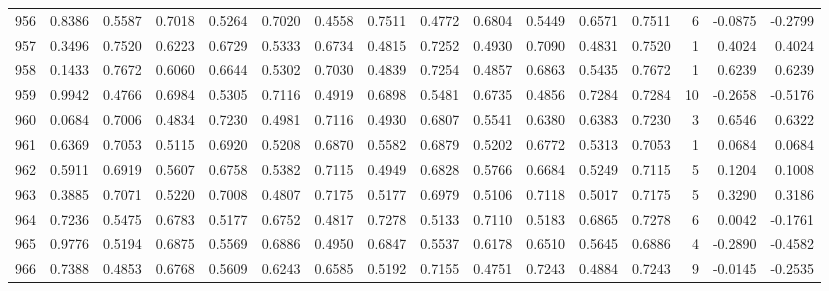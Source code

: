 \begin{tabular}{lrrrrrrrrrrrrrrr}
956 &      0.8386 &  0.5587 &  0.7018 &  0.5264 &  0.7020 &  0.4558 &  0.7511 &  0.4772 &  0.6804 &  0.5449 &   0.6571 &     0.7511 &      6 &                   -0.0875 &                    -0.2799 \\
957 &      0.3496 &  0.7520 &  0.6223 &  0.6729 &  0.5333 &  0.6734 &  0.4815 &  0.7252 &  0.4930 &  0.7090 &   0.4831 &     0.7520 &      1 &                    0.4024 &                     0.4024 \\
958 &      0.1433 &  0.7672 &  0.6060 &  0.6644 &  0.5302 &  0.7030 &  0.4839 &  0.7254 &  0.4857 &  0.6863 &   0.5435 &     0.7672 &      1 &                    0.6239 &                     0.6239 \\
959 &      0.9942 &  0.4766 &  0.6984 &  0.5305 &  0.7116 &  0.4919 &  0.6898 &  0.5481 &  0.6735 &  0.4856 &   0.7284 &     0.7284 &     10 &                   -0.2658 &                    -0.5176 \\
960 &      0.0684 &  0.7006 &  0.4834 &  0.7230 &  0.4981 &  0.7116 &  0.4930 &  0.6807 &  0.5541 &  0.6380 &   0.6383 &     0.7230 &      3 &                    0.6546 &                     0.6322 \\
961 &      0.6369 &  0.7053 &  0.5115 &  0.6920 &  0.5208 &  0.6870 &  0.5582 &  0.6879 &  0.5202 &  0.6772 &   0.5313 &     0.7053 &      1 &                    0.0684 &                     0.0684 \\
962 &      0.5911 &  0.6919 &  0.5607 &  0.6758 &  0.5382 &  0.7115 &  0.4949 &  0.6828 &  0.5766 &  0.6684 &   0.5249 &     0.7115 &      5 &                    0.1204 &                     0.1008 \\
963 &      0.3885 &  0.7071 &  0.5220 &  0.7008 &  0.4807 &  0.7175 &  0.5177 &  0.6979 &  0.5106 &  0.7118 &   0.5017 &     0.7175 &      5 &                    0.3290 &                     0.3186 \\
964 &      0.7236 &  0.5475 &  0.6783 &  0.5177 &  0.6752 &  0.4817 &  0.7278 &  0.5133 &  0.7110 &  0.5183 &   0.6865 &     0.7278 &      6 &                    0.0042 &                    -0.1761 \\
965 &      0.9776 &  0.5194 &  0.6875 &  0.5569 &  0.6886 &  0.4950 &  0.6847 &  0.5537 &  0.6178 &  0.6510 &   0.5645 &     0.6886 &      4 &                   -0.2890 &                    -0.4582 \\
966 &      0.7388 &  0.4853 &  0.6768 &  0.5609 &  0.6243 &  0.6585 &  0.5192 &  0.7155 &  0.4751 &  0.7243 &   0.4884 &     0.7243 &      9 &                   -0.0145 &                    -0.2535 \\

\end{tabular}
